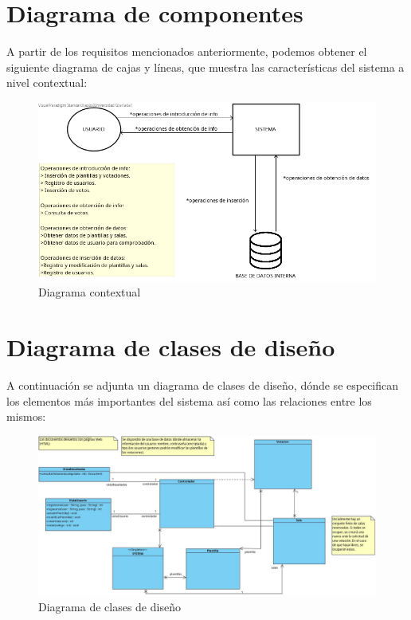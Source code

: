 \documentclass{article}
\begin{document}
	\section{Diagrama de componentes}
	A partir de los requisitos mencionados anteriormente, podemos obtener el siguiente diagrama de cajas y líneas, que muestra las características del sistema a nivel contextual:
	
	\begin{figure}[H]
		\centering
		\includegraphics[totalheight=7.5cm]{img/diagrama_cajas}
		\caption{Diagrama contextual}
	\end{figure}

	\section{Diagrama de clases de diseño}
	A continuación se adjunta un diagrama de clases de diseño, dónde se especifican los elementos más importantes del sistema así como las relaciones entre los mismos:
	
	\begin{figure}[H]
		\centering
		\includegraphics[totalheight=7cm]{img/5.jpg}
		\caption{Diagrama de clases de diseño}
	\end{figure}
	
\end{document}
